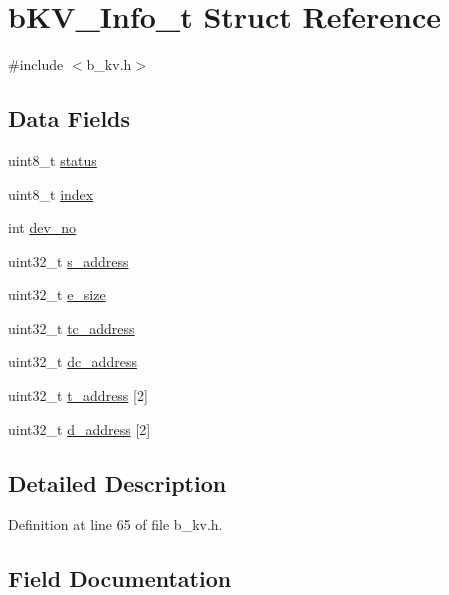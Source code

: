 \hypertarget{structb_k_v___info__t}{}\section{b\+K\+V\+\_\+\+Info\+\_\+t Struct Reference}
\label{structb_k_v___info__t}


{\ttfamily \#include $<$b\+\_\+kv.\+h$>$}

\subsection*{Data Fields}
\begin{DoxyCompactItemize}
\item 
uint8\+\_\+t \mbox{\hyperlink{structb_k_v___info__t_ade818037fd6c985038ff29656089758d}{status}}
\item 
uint8\+\_\+t \mbox{\hyperlink{structb_k_v___info__t_aae5a12e607d0f782506d9e6ec6179c64}{index}}
\item 
int \mbox{\hyperlink{structb_k_v___info__t_a104253e95536fa1af5f3d112f34b4088}{dev\+\_\+no}}
\item 
uint32\+\_\+t \mbox{\hyperlink{structb_k_v___info__t_aa9a2d5aaf853e3153e32a658212d8a80}{s\+\_\+address}}
\item 
uint32\+\_\+t \mbox{\hyperlink{structb_k_v___info__t_a0e665976f83c349126f51601137da330}{e\+\_\+size}}
\item 
uint32\+\_\+t \mbox{\hyperlink{structb_k_v___info__t_a8b5d1cee52dce06629197fc8c5772a98}{tc\+\_\+address}}
\item 
uint32\+\_\+t \mbox{\hyperlink{structb_k_v___info__t_aaa3b172aa206f426c2da1e4914cea8c8}{dc\+\_\+address}}
\item 
uint32\+\_\+t \mbox{\hyperlink{structb_k_v___info__t_a5c4804c2a09afa64478d74905ca41c9f}{t\+\_\+address}} \mbox{[}2\mbox{]}
\item 
uint32\+\_\+t \mbox{\hyperlink{structb_k_v___info__t_a8ccdf017d97f099449e11d9a22007849}{d\+\_\+address}} \mbox{[}2\mbox{]}
\end{DoxyCompactItemize}


\subsection{Detailed Description}


Definition at line 65 of file b\+\_\+kv.\+h.



\subsection{Field Documentation}
\mbox{\label{structb_k_v___info__t_a8ccdf017d97f099449e11d9a22007849}} 

